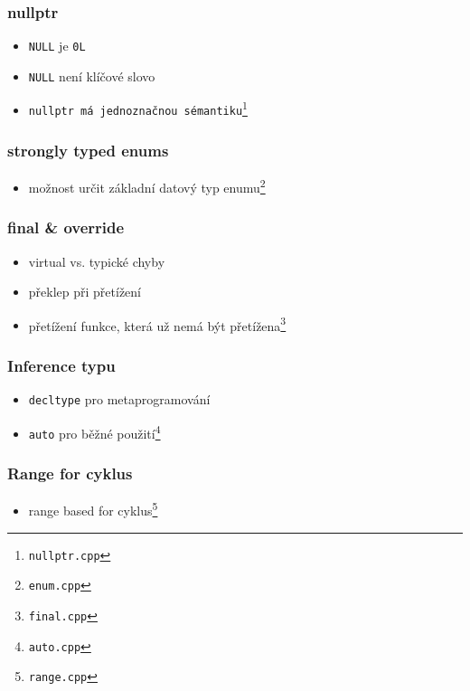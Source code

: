 
\begin{frame} \frametitle{nullptr}
	\begin{itemize}
		\item{\texttt{NULL} je \texttt{0L}}
		\item{\texttt{NULL} není klíčové slovo}
		\item{\texttt{nullptr má jednoznačnou sémantiku}\footnote{\texttt{nullptr.cpp}}}
	\end{itemize}
\end{frame}

\begin{frame} \frametitle{strongly typed enums}
	\begin{itemize}
		\item{možnost určit základní datový typ enumu\footnote{\texttt{enum.cpp}}}
	\end{itemize}
\end{frame}

\begin{frame} \frametitle{final \& override}
	\begin{itemize}
		\item{virtual vs. typické chyby}
		\item{překlep při přetížení}
		\item{přetížení funkce, která už nemá být přetížena\footnote{\texttt{final.cpp}}}
	\end{itemize}
\end{frame}

\begin{frame} \frametitle{Inference typu}
	\begin{itemize}
		\item{\texttt{decltype} pro metaprogramování}
		\item{\texttt{auto} pro běžné použití\footnote{\texttt{auto.cpp}}}
	\end{itemize}
\end{frame}

\begin{frame} \frametitle{Range for cyklus}
	\begin{itemize}
		\item{range based for cyklus\footnote{\texttt{range.cpp}}}
	\end{itemize}
\end{frame}

